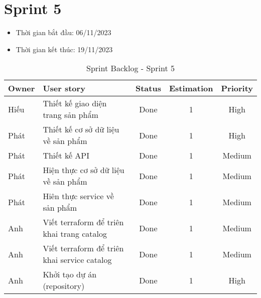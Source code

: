 \section{Sprint 5}
\begin{itemize}
    \item Thời gian bắt đầu: 06/11/2023
    \item Thời gian kết thúc: 19/11/2023
\end{itemize}
\begin{table}[H]
    \begin{tabular}{|m{2.5cm}|m{6cm}|c|c|c|}
    \hline
    \textbf{Owner}  & \textbf{User story}                                & \textbf{Status} & \textbf{Estimation} & \textbf{Priority} \\ \hline
    Hiếu               & Thiết kế giao diện trang sản phẩm                     & Done            & 1                   & High           \\ \hline
    Phát                & Thiết kế cơ sở dữ liệu về sản phẩm                     & Done            & 1                   & High           \\ \hline
    Phát                & Thiết kế API                      & Done            & 1                   & Medium          \\ \hline
    Phát               & Hiện thực cơ sở dữ liệu về sản phẩm                     & Done            & 1                   & Medium          \\ \hline
    Phát                & Hiên thực service về sản phẩm                     & Done            & 1                   & Medium          \\ \hline
    Anh               & Viết terraform để triên khai trang catalog                     & Done            & 1                   & Medium          \\ \hline
    Anh                & Viết terraform để triên khai service catalog                     & Done            & 1                   & Medium          \\ \hline
    Anh                & Khởi tạo dự án (repository)                    & Done            & 1                   & High           \\ \hline
    \end{tabular}
    \caption{Sprint Backlog - Sprint 5}
    \label{tab:sprint-5}
\end{table}
